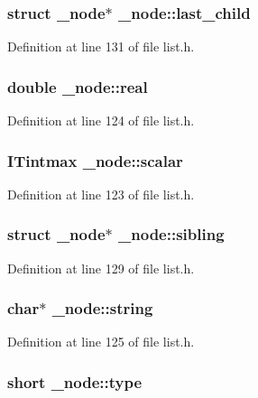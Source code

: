 \subsubsection{\setlength{\rightskip}{0pt plus 5cm}struct \bf{\_\-node}$\ast$ \bf{\_\-node::last\_\-child}}\label{struct__node_d31e5edc93a6eeaed8bbb54cb0cd1870}




Definition at line 131 of file list.h.
\subsubsection{\setlength{\rightskip}{0pt plus 5cm}double \bf{\_\-node::real}}\label{struct__node_0dda6898e2df8a511d06d4f7fb245d06}




Definition at line 124 of file list.h.
\subsubsection{\setlength{\rightskip}{0pt plus 5cm}\bf{ITintmax} \bf{\_\-node::scalar}}\label{struct__node_6eb46fe1a76eb70daf6e00b926dce254}




Definition at line 123 of file list.h.
\subsubsection{\setlength{\rightskip}{0pt plus 5cm}struct \bf{\_\-node}$\ast$ \bf{\_\-node::sibling}}\label{struct__node_572198530976e63ea537be5bb7dc1200}




Definition at line 129 of file list.h.
\subsubsection{\setlength{\rightskip}{0pt plus 5cm}char$\ast$ \bf{\_\-node::string}}\label{struct__node_6b52202021aa560979167ca44193073f}




Definition at line 125 of file list.h.
\subsubsection{\setlength{\rightskip}{0pt plus 5cm}short \bf{\_\-node::type}}\label{struct__node_9128a59508ab6b4daa3f05105036dfaf}




